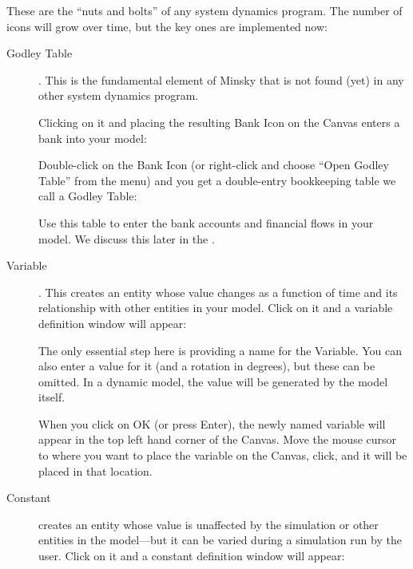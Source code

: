 
These are the ``nuts and bolts'' of any system dynamics program. The
number of icons will grow over time, but the key ones are implemented
now: 

\begin{description}
\item[Godley Table] . \label{GodleyTable} This is the
fundamental element of Minsky that is not found (yet) in any other
system dynamics program. 

Clicking on it and placing the resulting Bank Icon on the Canvas
enters a bank into your model:



Double-click on the Bank Icon (or right-click and choose ``Open Godley
Table'' from the menu) and you get a double-entry bookkeeping table we
call a Godley Table: 


 
Use this table to enter the bank accounts and financial flows in your model. We discuss this later in the .

\item[Variable]  . \label{Variable} This creates an entity
whose value changes as a function of time and its relationship with
other entities in your model. Click on it and a variable definition
window will appear:


The only essential step here is providing a name for the Variable. You
can also enter a value for it (and a rotation in degrees), but these
can be omitted. In a dynamic model, the value will be generated by the
model itself.


When you click on OK (or press Enter), the newly named variable will
appear in the top left hand corner of the Canvas. Move the mouse
cursor to where you want to place the variable on the Canvas, click,
and it will be placed in that location.


\item[Constant]  \label{Constant} creates an entity whose
value is unaffected by the simulation or other entities in the
model---but it can be varied during a simulation run by the
user. Click on it and a constant definition window will appear:




\end{description}
